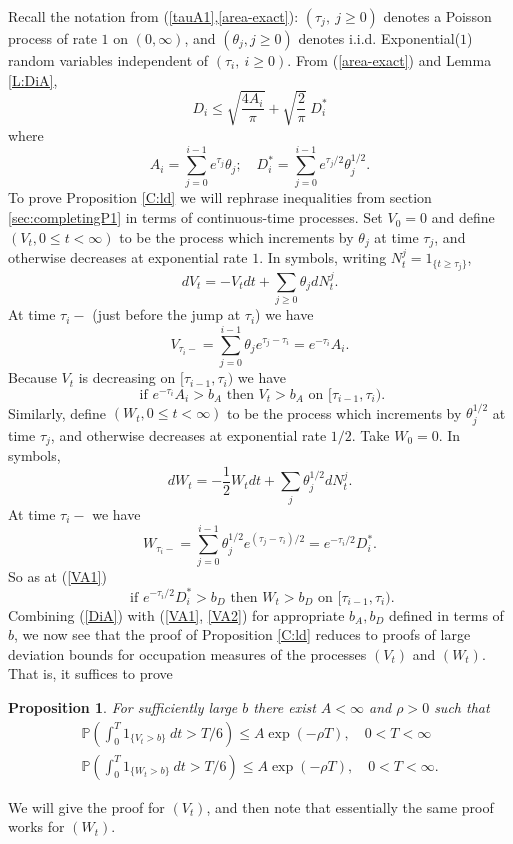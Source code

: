 \documentclass[12pt]{article}
\newtheorem{Proposition}[Lemma]{Proposition}
\newcommand{\sfrac}[2]{{\textstyle\frac{#1}{#2}}}
\renewcommand{\Pr}{{\mathbb P}}
\newcommand{\indic}{1}
\begin{document}
Recall the notation from (\ref{tauA1},\ref{area-exact}): 
 $(\tau_j, \ j \ge 0)$ denotes  a Poisson process of rate $1$ on 
$(0,\infty)$, and  $(\theta_j , j \ge 0)$ denotes  i.i.d. Exponential($1$) random variables
independent of $(\tau_i, \ i \ge 0)$. 
From (\ref{area-exact}) and Lemma \ref{L:DiA}, 
\begin{equation}
 D_i  \le \sqrt{ \sfrac{ 4 A_{i}}{\pi} } + \sqrt{ \sfrac{2}{\pi}} \  D^*_i 
 \label{DiA}
 \end{equation}
where
\[ A_i = \sum_{j=0}^{i-1} e^{\tau_j} \theta_j; \quad 
D^*_i  =  \sum_{j=0}^{i-1} e^{\tau_j /2} \theta_j^{1/2} . \]
To prove Proposition \ref{C:ld} we will rephrase  inequalities from
section \ref{sec:completingP1} in terms of continuous-time processes. 
Set $V_0 = 0$ and define $(V_t, 0 \le t < \infty)$ to be the process which increments by 
$\theta_j$ at time $\tau_j$, and otherwise decreases at exponential rate $1$.  
In symbols, writing $N^j_t = \indic_{\{ t \ge \tau_j\}}$, 
\[
dV_t = - V_t dt + \sum_{j \ge 0} \theta_j dN^j_t 
. \]
At time $\tau_i -$ (just before the jump at $\tau_i$) we have
\[ V_{\tau_i -} = \sum_{j = 0}^{i-1} \theta_j e^{\tau_j - \tau_i} 
= e^{-\tau_i} A_i . \] 
Because $V_t$ is decreasing on $[\tau_{i-1},\tau_i)$ we have 
\begin{equation}
 \mbox{ if } e^{-\tau_i}A_i > b_A \mbox{ then } V_t > b_A \mbox{ on } [\tau_{i-1},\tau_i) . 
 \label{VA1}
 \end{equation}
Similarly, define $(W_t, 0 \le t < \infty)$ to be the process which increments by 
$\theta^{1/2} _j$ at time $\tau_j$, and otherwise decreases at exponential rate $1/2$.  
Take $W_0 = 0$.
In symbols, 
\[
dW_t = -  \sfrac{1}{2} W_t dt + \sum_j \theta^{1/2}_j dN^j_t 
. \]
At time $\tau_i -$ we have
\[ W_{\tau_i -} = \sum_{j = 0}^{i-1} \theta^{1/2}_j e^{(\tau_j - \tau_i)/2} 
= e^{-\tau_i/2} D^*_i . \] 
So as at (\ref{VA1})
\begin{equation}
 \mbox{ if } e^{-\tau_i/2}D^*_i > b_D \mbox{ then } W_t > b_D \mbox{ on } [\tau_{i-1},\tau_i) . 
 \label{VA2}
 \end{equation}
Combining (\ref{DiA}) with (\ref{VA1}, \ref{VA2}) for appropriate $b_A, b_D$ defined in terms of $b$, we now see 
that the proof of  Proposition \ref{C:ld} reduces to proofs of large deviation bounds for occupation measures 
of the processes $(V_t)$ and $(W_t)$.  
That is, it suffices to prove 
\begin{Proposition}
For sufficiently large $b $ there exist $A < \infty$ and $\rho > 0 $ such that
\begin{eqnarray}
\Pr \left( \int_0^T \indic_{ \{V_t > b \}} \ dt  > T/6 \right) \le A \exp(-\rho T), \quad 0<T<\infty 
\label{ld2} \\
\Pr \left( \int_0^T \indic_{ \{W_t >  b \}} \ dt  > T/6 \right) \le A \exp(-\rho T), \quad 0<T<\infty 
\label{ld3}.
\end{eqnarray}
\end{Proposition}
We will give the proof for $(V_t)$, and then note that essentially the same proof works for $(W_t)$.
\end{document}
